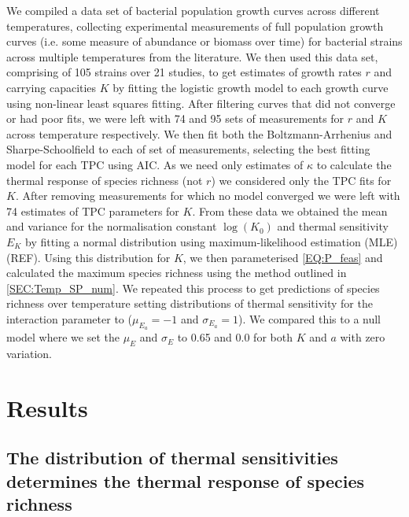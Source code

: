 \documentclass{article}
\begin{document}
We compiled a data set of bacterial population growth curves across different temperatures, collecting experimental measurements of full population growth curves (i.e. some measure of abundance or biomass over time) for bacterial strains across multiple temperatures from the literature. We then used this data set, comprising of 105 strains over 21 studies, to get estimates of growth rates $r$ and carrying capacities $K$ by fitting the logistic growth model to each growth curve using non-linear least squares fitting. After filtering curves that did not converge or had poor fits, we were left with 74 and 95 sets of measurements for $r$ and $K$ across temperature respectively. We then fit both the Boltzmann-Arrhenius and Sharpe-Schoolfield \citep{Schoolfield1981} to each of set of measurements, selecting the best fitting model for each TPC using AIC. As we need only estimates of $\kappa$ to calculate the thermal response of species richness  (not $r$) we considered only the TPC fits for $K$. After removing measurements for which no model converged we were left with 74 estimates of TPC parameters for $K$. From these data we obtained the mean and variance for the normalisation constant $\log(K_0)$ and thermal sensitivity $E_K$ by fitting a normal distribution using maximum-likelihood estimation (MLE) (REF). Using this distribution for $K$, we then parameterised \cref{EQ:P_feas} and calculated the maximum species richness using the method outlined in \cref{SEC:Temp_SP_num}. We repeated this process to get predictions of species richness over temperature setting distributions of thermal sensitivity for the interaction parameter to ($\mu_{E_a} = -1$ and $\sigma_{E_a} = 1$). We compared this to a null model where we set the $\mu_E$ and $\sigma_E$ to 0.65 and 0.0 for both $K$ and $a$ with zero variation.

\section*{Results}

\subsection*{The distribution of thermal sensitivities determines the thermal response of species richness}
\end{document}
